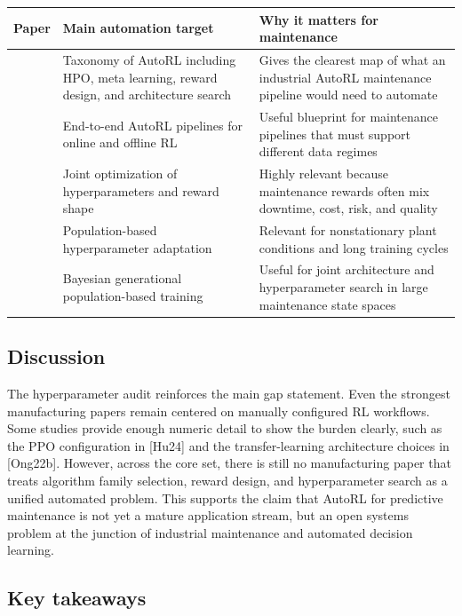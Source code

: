 \begin{table}[htbp]
\centering
\small
\begin{tabular}{p{} p{} p{}}
\hline
Paper & Main automation target & Why it matters for maintenance \\
\hline
[Par22] & Taxonomy of AutoRL including HPO, meta learning, reward design, and architecture search & Gives the clearest map of what an industrial AutoRL maintenance pipeline would need to automate \\
[Mus22] & End-to-end AutoRL pipelines for online and offline RL & Useful blueprint for maintenance pipelines that must support different data regimes \\
[Die24] & Joint optimization of hyperparameters and reward shape & Highly relevant because maintenance rewards often mix downtime, cost, risk, and quality \\
[Bai24] & Population-based hyperparameter adaptation & Relevant for nonstationary plant conditions and long training cycles \\
[Wan22c] & Bayesian generational population-based training & Useful for joint architecture and hyperparameter search in large maintenance state spaces \\
\hline
\end{tabular}
\end{table}

\subsection{Discussion}

The hyperparameter audit reinforces the main gap statement. Even the strongest manufacturing papers remain centered on manually configured RL workflows. Some studies provide enough numeric detail to show the burden clearly, such as the PPO configuration in [Hu24] and the transfer-learning architecture choices in [Ong22b]. However, across the core set, there is still no manufacturing paper that treats algorithm family selection, reward design, and hyperparameter search as a unified automated problem. This supports the claim that AutoRL for predictive maintenance is not yet a mature application stream, but an open systems problem at the junction of industrial maintenance and automated decision learning.

\subsection{Key takeaways}

